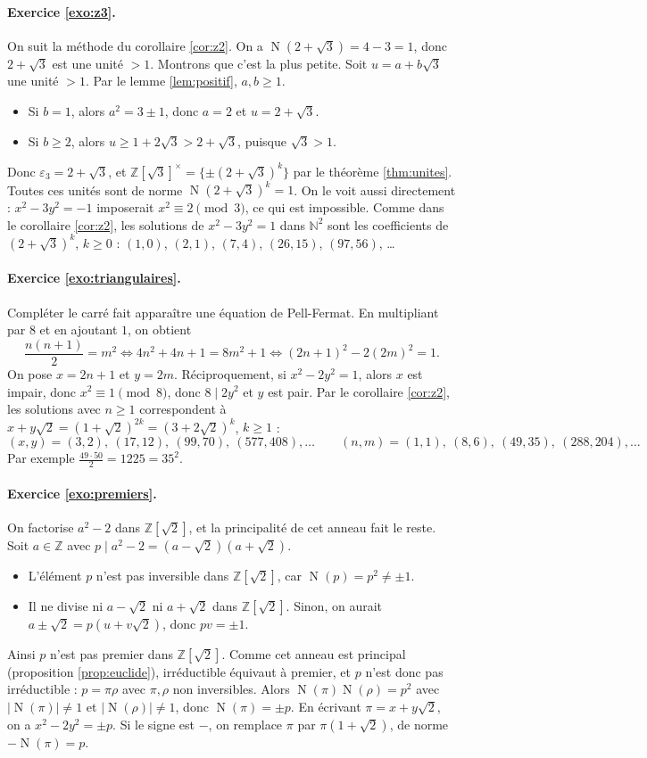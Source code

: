 \documentclass[11pt,a4paper]{article}
\theoremstyle{plain}
\theoremstyle{definition}
\theoremstyle{remark}
\newcommand{\N}{\mathbb{N}}
\newcommand{\Z}{\mathbb{Z}}
\DeclareMathOperator{\Nm}{N}
\begin{document}
\paragraph{Exercice \ref{exo:z3}.} On suit la méthode du corollaire \ref{cor:z2}. On a $\Nm(2+\sqrt3)=4-3=1$, donc $2+\sqrt3$ est une unité $>1$. Montrons que c'est la plus petite. Soit $u=a+b\sqrt3$ une unité $>1$. Par le lemme \ref{lem:positif}, $a,b\geq1$.
\begin{itemize}[nosep]
\item Si $b=1$, alors $a^2=3\pm1$, donc $a=2$ et $u=2+\sqrt3$.
\item Si $b\geq2$, alors $u\geq1+2\sqrt3>2+\sqrt3$, puisque $\sqrt3>1$.
\end{itemize}
Donc $\varepsilon_3=2+\sqrt3$, et $\Z[\sqrt3]^\times=\{\pm(2+\sqrt3)^k\}$ par le théorème \ref{thm:unites}. Toutes ces unités sont de norme $\Nm(2+\sqrt3)^k=1$. On le voit aussi directement : $x^2-3y^2=-1$ imposerait $x^2\equiv2\pmod3$, ce qui est impossible. Comme dans le corollaire \ref{cor:z2}, les solutions de $x^2-3y^2=1$ dans $\N^2$ sont les coefficients de $(2+\sqrt3)^k$, $k\geq0$ : $(1,0)$, $(2,1)$, $(7,4)$, $(26,15)$, $(97,56)$, \dots

\paragraph{Exercice \ref{exo:triangulaires}.} Compléter le carré fait apparaître une équation de Pell-Fermat. En multipliant par $8$ et en ajoutant $1$, on obtient
\[
  \frac{n(n+1)}2=m^2\iff 4n^2+4n+1=8m^2+1\iff(2n+1)^2-2(2m)^2=1 .
\]
On pose $x=2n+1$ et $y=2m$. Réciproquement, si $x^2-2y^2=1$, alors $x$ est impair, donc $x^2\equiv1\pmod8$, donc $8\mid2y^2$ et $y$ est pair. Par le corollaire \ref{cor:z2}, les solutions avec $n\geq1$ correspondent à $x+y\sqrt2=(1+\sqrt2)^{2k}=(3+2\sqrt2)^k$, $k\geq1$ :
\[
  (x,y)=(3,2),\ (17,12),\ (99,70),\ (577,408),\dots\qquad
  (n,m)=(1,1),\ (8,6),\ (49,35),\ (288,204),\dots
\]
Par exemple $\frac{49\cdot50}2=1225=35^2$.

\paragraph{Exercice \ref{exo:premiers}.} On factorise $a^2-2$ dans $\Z[\sqrt2]$, et la principalité de cet anneau fait le reste. Soit $a\in\Z$ avec $p\mid a^2-2=(a-\sqrt2)(a+\sqrt2)$.
\begin{itemize}[nosep]
\item L'élément $p$ n'est pas inversible dans $\Z[\sqrt2]$, car $\Nm(p)=p^2\neq\pm1$.
\item Il ne divise ni $a-\sqrt2$ ni $a+\sqrt2$ dans $\Z[\sqrt2]$. Sinon, on aurait $a\pm\sqrt2=p(u+v\sqrt2)$, donc $pv=\pm1$.
\end{itemize}
Ainsi $p$ n'est pas premier dans $\Z[\sqrt2]$. Comme cet anneau est principal (proposition \ref{prop:euclide}), irréductible équivaut à premier, et $p$ n'est donc pas irréductible : $p=\pi\rho$ avec $\pi,\rho$ non inversibles. Alors $\Nm(\pi)\Nm(\rho)=p^2$ avec $|\Nm(\pi)|\neq1$ et $|\Nm(\rho)|\neq1$, donc $\Nm(\pi)=\pm p$. En écrivant $\pi=x+y\sqrt2$, on a $x^2-2y^2=\pm p$. Si le signe est $-$, on remplace $\pi$ par $\pi(1+\sqrt2)$, de norme $-\Nm(\pi)=p$.
\end{document}
